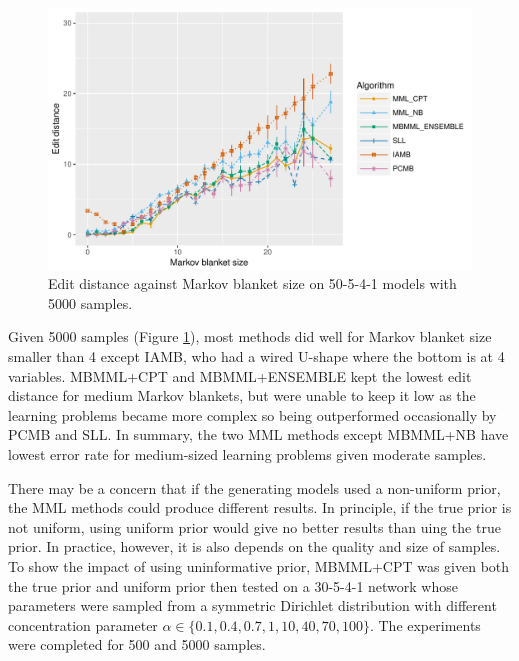 \begin{figure}[H]
  \centering
    \includegraphics[scale=0.6]{figures/ed_vs_mbsize_50_5_4_1_5000.pdf}
  \caption{Edit distance against Markov blanket size on 50-5-4-1 models with 5000 samples.}
  \label{fg:ed_mb_50_5000}
\end{figure}
Given 5000 samples (Figure \ref{fg:ed_mb_50_5000}), most methods did well for Markov blanket size smaller than 4 except IAMB, who had a wired U-shape where the bottom is at 4 variables. MBMML+CPT and MBMML+ENSEMBLE kept the lowest edit distance for medium Markov blankets, but were unable to keep it low as the learning problems became more complex so being outperformed occasionally by PCMB and SLL. In summary, the two MML methods except MBMML+NB have lowest error rate for medium-sized learning problems given moderate samples. 

There may be a concern that if the generating models used a non-uniform prior, the MML methods could produce different results. In principle, if the true prior is not uniform, using uniform prior would give no better results than uing the true prior. In practice, however, it is also depends on the quality and size of samples. To show the impact of using uninformative prior, MBMML+CPT was given both the true prior and uniform prior then tested on a 30-5-4-1 network whose parameters were sampled from a symmetric Dirichlet distribution with different concentration parameter $\alpha \in \{0.1, 0.4, 0.7, 1, 10, 40, 70, 100\}$. The experiments were completed for 500 and 5000 samples. 

